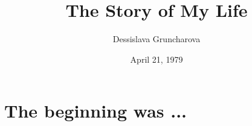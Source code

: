 \documentclass[a4paper,11pt]{article}
\title{The Story of My Life}
\author{Dessislava Gruncharova}
\date{April 21, 1979}
\begin{document}
\maketitle

\section{The beginning was ...}
\end{document}
